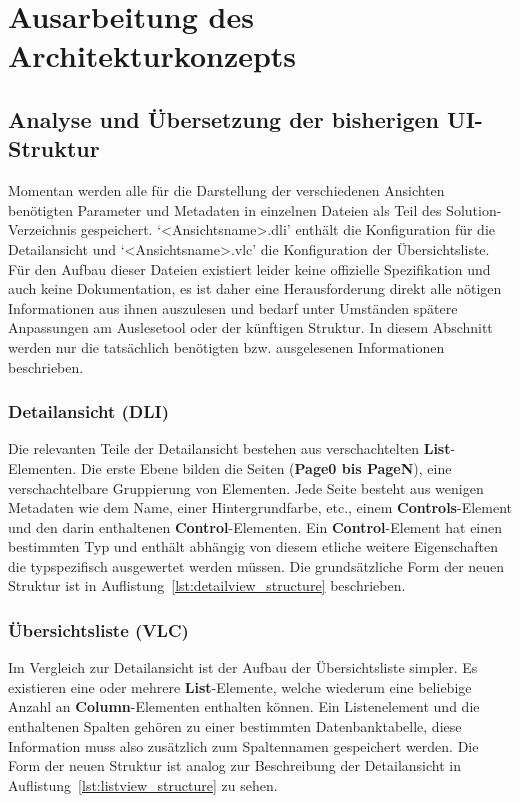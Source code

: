 \chapter{Ausarbeitung des Architekturkonzepts}\label{chap:concept}
\section{Analyse und Übersetzung der bisherigen UI-Struktur}\label{sec:ui_structure_translation}
Momentan werden alle für die Darstellung der verschiedenen Ansichten benötigten Parameter und Metadaten in einzelnen Dateien als Teil des Solution-Verzeichnis gespeichert. `<Ansichtsname>.dli' enthält die Konfiguration für die Detailansicht und `<Ansichtsname>.vlc' die Konfiguration der Übersichtsliste. Für den Aufbau dieser Dateien existiert leider keine offizielle Spezifikation und auch keine Dokumentation, es ist daher eine Herausforderung direkt alle nötigen Informationen aus ihnen auszulesen und bedarf unter Umständen spätere Anpassungen am Auslesetool oder der künftigen Struktur. In diesem Abschnitt werden nur die tatsächlich benötigten bzw. ausgelesenen Informationen beschrieben.

\subsection{Detailansicht (DLI)}
Die relevanten Teile der Detailansicht bestehen aus verschachtelten \textbf{List}-Elementen. Die erste Ebene bilden die Seiten (\textbf{Page0 bis PageN}), eine verschachtelbare Gruppierung von Elementen. Jede Seite besteht aus wenigen Metadaten wie dem Name, einer Hintergrundfarbe, etc., einem \textbf{Controls}-Element und den darin enthaltenen \textbf{Control}-Elementen. Ein \textbf{Control}-Element hat einen bestimmten Typ und enthält abhängig von diesem etliche weitere Eigenschaften die typspezifisch ausgewertet werden müssen. Die grundsätzliche Form der neuen Struktur ist in Auflistung~\ref{lst:detailview_structure} beschrieben.



\subsection{Übersichtsliste (VLC)}
Im Vergleich zur Detailansicht ist der Aufbau der Übersichtsliste simpler. Es existieren eine oder mehrere \textbf{List}-Elemente, welche wiederum eine beliebige Anzahl an \textbf{Column}-Elementen enthalten können. Ein Listenelement und die enthaltenen Spalten gehören zu einer bestimmten Datenbanktabelle, diese Information muss also zusätzlich zum Spaltennamen gespeichert werden. Die Form der neuen Struktur ist analog zur Beschreibung der Detailansicht in Auflistung~\ref{lst:listview_structure} zu sehen.

